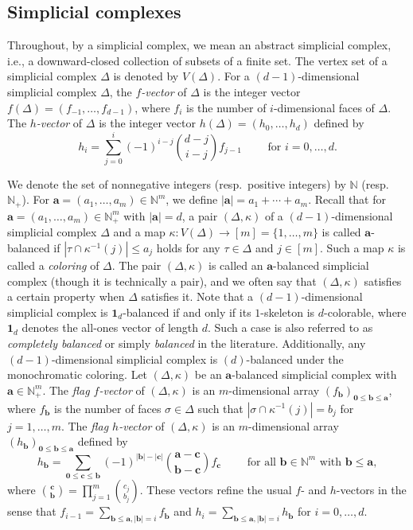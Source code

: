 \documentclass[11pt]{article}
\theoremstyle{definition}
\numberwithin{equation}{section}
\begin{document}
\subsection{Simplicial complexes}
Throughout, by a simplicial complex, we mean an abstract simplicial complex, i.e., a downward-closed collection of subsets of a finite set.
The vertex set of a simplicial complex $\Delta$ is denoted by $V(\Delta)$.
For a $(d-1)$-dimensional simplicial complex $\Delta$, the \emph{$f$-vector} of $\Delta$ is the integer vector $f(\Delta)=(f_{-1},\ldots,f_{d-1})$, where $f_i$ is the number of $i$-dimensional faces of $\Delta$. The \emph{$h$-vector} of $\Delta$ is the integer vector $h(\Delta)=(h_0,\ldots,h_d)$ defined by 
\[
h_i = \sum_{j=0}^i (-1)^{i-j} \binom{d-j}{i-j} f_{j-1} \qquad \text{ for $i=0,\ldots,d$}.
\]

We denote the set of nonnegative integers (resp.~positive integers) by $\mathbb{N}$ (resp.~$\mathbb{N}_+$).
For $\bm{a}=(a_1,\ldots,a_m) \in \mathbb{N}^m$, we define $|\bm{a}|=a_1+\cdots+a_m$.
Recall that for $\bm{a}=(a_1,\ldots,a_m) \in \mathbb{N}^m_+$ with $|\bm{a}|=d$, a pair $(\Delta,\kappa)$ of a $(d-1)$-dimensional simplicial complex $\Delta$ and a map $\kappa:V(\Delta)\rightarrow [m]=\{1,\ldots,m\}$ is called $\bm{a}$-balanced if $|\tau \cap \kappa^{-1}(j)| \leq a_j$ holds for any $\tau \in \Delta$ and $j \in [m]$. Such a map $\kappa$ is called a \emph{coloring} of $\Delta$.
The pair $(\Delta,\kappa)$ is called an $\bm{a}$-balanced simplicial complex (though it is technically a pair), and we often say that $(\Delta,\kappa)$ satisfies a certain property when $\Delta$ satisfies it.
Note that a $(d-1)$-dimensional simplicial complex is $\bm{1}_d$-balanced if and only if its $1$-skeleton is $d$-colorable, where $\bm{1}_d$ denotes the all-ones vector of length $d$. Such a case is also referred to as \emph{completely balanced} or simply \emph{balanced} in the literature. Additionally, any $(d-1)$-dimensional simplicial complex is $(d)$-balanced under the monochromatic coloring.
Let $(\Delta,\kappa)$ be an $\bm{a}$-balanced simplicial complex with $\bm{a} \in \mathbb{N}_+^m$.
The \emph{flag $f$-vector} of $(\Delta,\kappa)$ is an $m$-dimensional array $(f_{\bm{b}})_{\bm{0}\leq\bm{b}\leq\bm{a}}$, where $f_{\bm{b}}$ is the number of faces $\sigma \in \Delta$ such that $|\sigma \cap \kappa^{-1}(j)|=b_j$ for $j=1,\ldots,m$. 
The \emph{flag $h$-vector} of $(\Delta,\kappa)$ is an $m$-dimensional array $(h_{\bm{b}})_{\bm{0}\leq\bm{b}\leq\bm{a}}$ defined by
\[
h_{\bm{b}}=\sum_{\bm{0} \leq \bm{c}\leq\bm{b}}(-1)^{|\bm{b}|-|\bm{c}|}\binom{\bm{a}-\bm{c}}{\bm{b}-\bm{c}}f_{\bm{c}} \qquad \text{ for all $\bm{b} \in \mathbb{N}^m$ with $\bm{b} \leq \bm{a}$},
\]
where $\binom{\bm{c}}{\bm{b}}=\prod_{j=1}^m \binom{c_j}{b_j}$.
These vectors refine the usual $f$- and $h$-vectors in the sense that $f_{i-1}=\sum_{\bm{b} \leq \bm{a}, |\bm{b}|=i} f_{\bm{b}}$ and $h_{i}=\sum_{\bm{b} \leq \bm{a}, |\bm{b}|=i} h_{\bm{b}}$ for $i=0,\ldots,d$.
\end{document}
